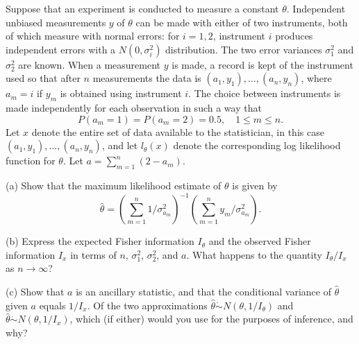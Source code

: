 \begin{exercise}
\label{applied:2011:6}
Suppose that an experiment is conducted to measure a constant $\theta$. Independent unbiased measurements $y$ of $\theta$ can be made with either of two instruments, both of which measure with normal errors: for $i = 1 , 2$, instrument $i$ produces independent errors with a $N ( 0 , \sigma _ { i } ^ { 2 } )$ distribution. The two error variances $\sigma _ { 1 } ^ { 2 }$ and $\sigma _ { 2 } ^ { 2 }$ are known. When a measurement $y$ is made, a record is kept of the instrument used so that after $n$ measurements the data is $( a _ { 1 } , y _ { 1 } ) , \dotsc , ( a _ { n } , y _ { n } )$, where $a _ { m } = i$ if $y _ { m }$ is obtained using instrument $i$. The choice between instruments is made independently for each observation in such a way that
\[
P (a _ {m} = 1) = P (a _ {m} = 2) = 0.5, \quad 1 \leq m \leq n.
\]
Let $x$ denote the entire set of data available to the statistician, in this case $( a _ { 1 } , y _ { 1 } ) , \dotsc , ( a _ { n } , y _ { n } )$, and let $l _ { \theta } ( x )$ denote the corresponding log likelihood function for $\theta$. Let $a = \sum _ { m = 1 } ^ { n } ( 2 - a _ { m } )$.

(a) Show that the maximum likelihood estimate of $\theta$ is given by
\[
\hat {\theta} = \left(\sum_ {m = 1} ^ {n} 1 / \sigma_ {a _ {m}} ^ {2}\right) ^ {- 1} \left(\sum_ {m = 1} ^ {n} y _ {m} / \sigma_ {a _ {m}} ^ {2}\right).
\]

(b) Express the expected Fisher information $I _ { \theta }$ and the observed Fisher information $I _ { x }$ in terms of $n$, $\sigma _ { 1 } ^ { 2 }$, $\sigma _ { 2 } ^ { 2 }$, and $a$. What happens to the quantity $I _ { \theta } / I _ { x }$ as $n \to \infty$?

(c) Show that $a$ is an ancillary statistic, and that the conditional variance of $\hat { \theta }$ given $a$ equals $1 / I _ { x }$. Of the two approximations $\hat {\theta} \dot{\sim} N (\theta , 1 / I _ {\theta})$ and $\hat {\theta} \dot{\sim} N (\theta , 1 / I _ {x})$, which (if either) would you use for the purposes of inference, and why?
\end{exercise}

